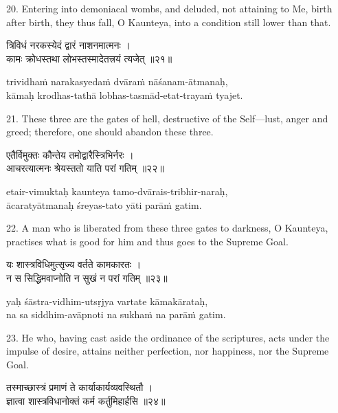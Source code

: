 20. Entering into demoniacal wombs, and deluded, not attaining to Me, birth
after birth, they thus fall, O Kaunteya, into a condition still lower than
that.

\begin{gitaverse}
त्रिविधं नरकस्येदं द्वारं नाशनमात्मनः । \\
कामः क्रोधस्तथा लोभस्तस्मादेतत्त्रयं त्यजेत् ॥२१॥
\end{gitaverse}

\begin{transliteration}
trividhaṁ narakasyedaṁ dvāraṁ nāśanam-ātmanaḥ, \\
kāmaḥ krodhas-tathā lobhas-tasmād-etat-trayaṁ tyajet.
\end{transliteration}

21. These three are the gates of hell, destructive of the Self---lust, anger
and greed; therefore, one should abandon these three.

\begin{gitaverse}
एतैर्विमुक्तः कौन्तेय तमोद्वारैस्त्रिभिर्नरः । \\
आचरत्यात्मनः श्रेयस्ततो याति परां गतिम् ॥२२॥
\end{gitaverse}

\begin{transliteration}
etair-vimuktaḥ kaunteya tamo-dvārais-tribhir-naraḥ, \\
ācaratyātmanaḥ śreyas-tato yāti parāṁ gatim.
\end{transliteration}

22. A man who is liberated from these three gates to darkness, O Kaunteya,
practises what is good for him and thus goes to the Supreme Goal.

\begin{gitaverse}
यः शास्त्रविधिमुत्सृज्य वर्तते कामकारतः । \\
न स सिद्धिमवाप्नोति न सुखं न परां गतिम् ॥२३॥
\end{gitaverse}

\begin{transliteration}
yaḥ śāstra-vidhim-utsṛjya vartate kāmakārataḥ, \\
na sa siddhim-avāpnoti na sukhaṁ na parāṁ gatim.
\end{transliteration}

23. He who, having cast aside the ordinance of the scriptures, acts under the
impulse of desire, attains neither perfection, nor happiness, nor the Supreme
Goal.

\begin{gitaverse}
तस्माच्छास्त्रं प्रमाणं ते कार्याकार्यव्यवस्थितौ । \\
ज्ञात्वा शास्त्रविधानोक्तं कर्म कर्तुमिहार्हसि ॥२४॥
\end{gitaverse}

